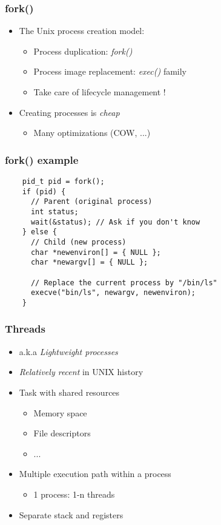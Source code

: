 \begin{frame}
  \frametitle{fork()}

  \begin{itemize}
  \item The Unix process creation model:
    \begin{itemize}
    \item Process duplication: \emph{fork()}
    \item Process image replacement: \emph{exec()} family
    \item Take care of lifecycle management !
    \end{itemize}
  \item Creating processes is \emph{cheap}
    \begin{itemize}
    \item Many optimizations (COW, ...)
    \end{itemize}
  \end{itemize}
\end{frame}


\begin{frame}[fragile]
  \frametitle{fork() example}

  \begin{verbatim}
    pid_t pid = fork();
    if (pid) {
      // Parent (original process)
      int status;
      wait(&status); // Ask if you don't know
    } else {
      // Child (new process)
      char *newenviron[] = { NULL };
      char *newargv[] = { NULL };

      // Replace the current process by "/bin/ls"
      execve("bin/ls", newargv, newenviron);
    }
  \end{verbatim}
\end{frame}



\begin{frame}
  \frametitle{Threads}

  \begin{itemize}
  \item a.k.a \emph{Lightweight processes}
  \item \emph{Relatively recent} in UNIX history
  \item Task with shared resources
    \begin{itemize}
    \item Memory space
    \item File descriptors
    \item ...
    \end{itemize}
  \item Multiple execution path within a process
    \begin{itemize}
    \item 1 process: 1-n threads
    \end{itemize}
  \item Separate stack and registers
  \end{itemize}
\end{frame}


